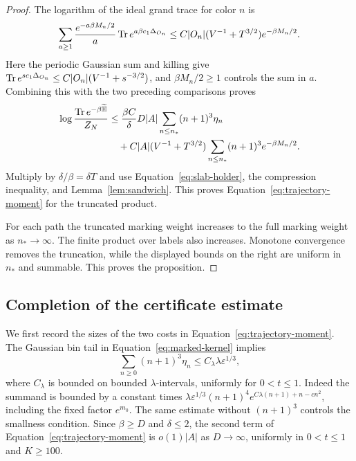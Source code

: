 \begin{proof}
The logarithm of the ideal grand trace for color
$n$ is
\[
 \sum_{a\ge1}\frac{e^{-a\beta M_n/2}}a
                  \operatorname{Tr} e^{a\beta c_1\Delta_{O_n}}
 \le C|O_n|(V^{-1}+T^{3/2})e^{-\beta M_n/2}.
\]
Here the periodic Gaussian sum and killing give
$\operatorname{Tr} e^{s c_1\Delta_{O_n}}
 \le C|O_n|(V^{-1}+s^{-3/2})$,
and $\beta M_n/2\ge1$ controls the sum in $a$.
Combining this with the two preceding comparisons
proves
\begin{align*}
 \log\frac{\operatorname{Tr} e^{-\beta\widetilde{\mathbb H}}}{Z_N}
 &\le\frac{\beta C}{\delta}D|A|
                      \sum_{n\le n_*}(n+1)^3\eta_n\\
 &\quad+C|A|(V^{-1}+T^{3/2})
                      \sum_{n\le n_*}(n+1)^3e^{-\beta M_n/2}.
\end{align*}
Multiply by $\delta/\beta=\delta T$ and use
Equation~\eqref{eq:slab-holder}, the compression
inequality, and Lemma~\ref{lem:sandwich}.
This proves Equation~\eqref{eq:trajectory-moment}
for the truncated product.

For each path the truncated marking weight increases
to the full marking weight as $n_*\to\infty$.
The finite product over labels also increases.
Monotone convergence removes the truncation, while
the displayed bounds on the right are uniform in
$n_*$ and summable.  This proves the proposition.
\end{proof}

\subsection{Completion of the certificate estimate}

We first record the sizes of the two costs in
Equation~\eqref{eq:trajectory-moment}.  The Gaussian
bin tail in Equation~\eqref{eq:marked-kernel} implies
\begin{equation}\label{eq:eta-sum}
 \sum_{n\ge0}(n+1)^3\eta_n
 \le C_\lambda\lambda\varepsilon^{1/3},
\end{equation}
where $C_\lambda$ is bounded on bounded
$\lambda$-intervals, uniformly for $0<t\le1$.
Indeed the summand is bounded by a constant times
$\lambda\varepsilon^{1/3}(n+1)^4
 e^{C\lambda(n+1)+n-cn^2}$, including the fixed
factor $e^{m_0}$.  The same estimate without
$(n+1)^3$ controls the smallness condition.
Since $\beta\ge D$ and $\delta\le2$, the second
term of Equation~\eqref{eq:trajectory-moment} is
$o(1)|A|$ as $D\to\infty$, uniformly in
$0<t\le1$ and $K\ge100$.

